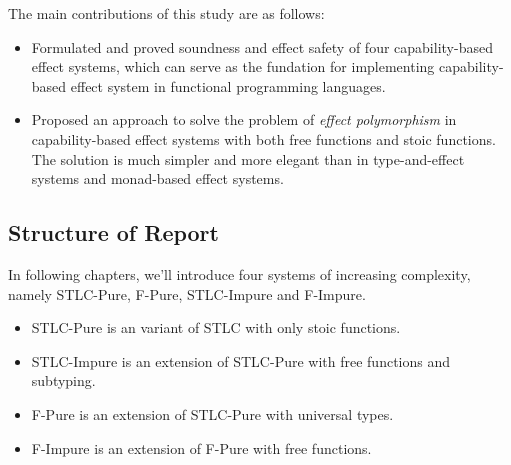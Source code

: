 The main contributions of this study are as follows:

\begin{itemize}
\item Formulated and proved soundness and effect safety of four
  capability-based effect systems, which can serve as the fundation
  for implementing capability-based effect system in functional
  programming languages.
\item Proposed an approach to solve the problem of \emph{effect
    polymorphism} in capability-based effect systems with both free
  functions and stoic functions. The solution is much simpler and more
  elegant than in type-and-effect systems and monad-based effect
  systems.
\end{itemize}

\subsection{Structure of Report}

In following chapters, we'll introduce four systems of increasing
complexity, namely STLC-Pure, F-Pure, STLC-Impure and F-Impure.

\begin{itemize}
\item STLC-Pure is an variant of STLC with only stoic functions.
\item STLC-Impure is an extension of STLC-Pure with free functions and subtyping.
\item F-Pure is an extension of STLC-Pure with universal types.
\item F-Impure is an extension of F-Pure with free functions.
\end{itemize}
